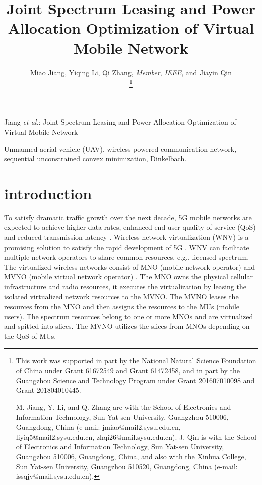 \documentclass[journal]{IEEEtran}
\begin{document}
	
\title{Joint Spectrum Leasing and Power Allocation Optimization of Virtual Mobile Network}
	
\author{Miao Jiang, Yiqing Li, Qi Zhang, \emph{Member}, \emph{IEEE}, and Jiayin Qin

\thanks{This work was supported in part by the National Natural Science Foundation of China under Grant 61672549 and Grant 61472458, and in part by the Guangzhou Science and Technology Program under Grant 201607010098 and Grant 201804010445.

M. Jiang, Y. Li, and Q. Zhang are with the School of Electronics and Information Technology, Sun Yat-sen University, Guangzhou 510006, Guangdong, China (e-mail: jmiao@mail2.sysu.edu.cn, liyiq5@mail2.sysu.edu.cn, zhqi26@mail.sysu.edu.cn). J. Qin is with the School of Electronics and
Information Technology, Sun Yat-sen University, Guangzhou 510006, Guangdong,  China, and also with the Xinhua College, Sun Yat-sen University, Guangzhou 510520, Guangdong, China (e-mail: issqjy@mail.sysu.edu.cn). }
}%
	
	
{Jiang \MakeLowercase{\textit{et al.}}: Joint Spectrum Leasing and Power Allocation Optimization of Virtual Mobile Network}
	
\maketitle
\begin{abstract}

\end{abstract}
\begin{IEEEkeywords} Unmanned aerial vehicle (UAV), wireless powered communication network, sequential unconstrained convex minimization, Dinkelbach.
\end{IEEEkeywords}
\IEEEpeerreviewmaketitle
	
\section{introduction}
To satisfy dramatic traffic growth over the next decade, 5G mobile networks are expected to achieve higher data rates, enhanced end-user quality-of-service (QoS) and reduced transmission latency \cite{NPanwar,NAlFalahy}. Wireless network virtualization (WNV) is a promising solution to satisfy the rapid development of 5G \cite{CLiang}. WNV can facilitate multiple network operators to share common resources, e.g., licensed spectrum. The virtualized wireless networks consist of MNO (mobile network operator) and MVNO (mobile virtual network operator) \cite{RKokku}. The MNO owns the physical cellular infrastructure and radio
resources, it executes the virtualization by leasing the isolated virtualized network resources to the MVNO. The MVNO leases the resources from the MNO and then assigns the resources to the MUs (mobile users). The spectrum resources belong to one or more MNOs and are virtualized and spitted into slices. The MVNO utilizes the slices from MNOs depending on the QoS of MUs.
\end{document}
